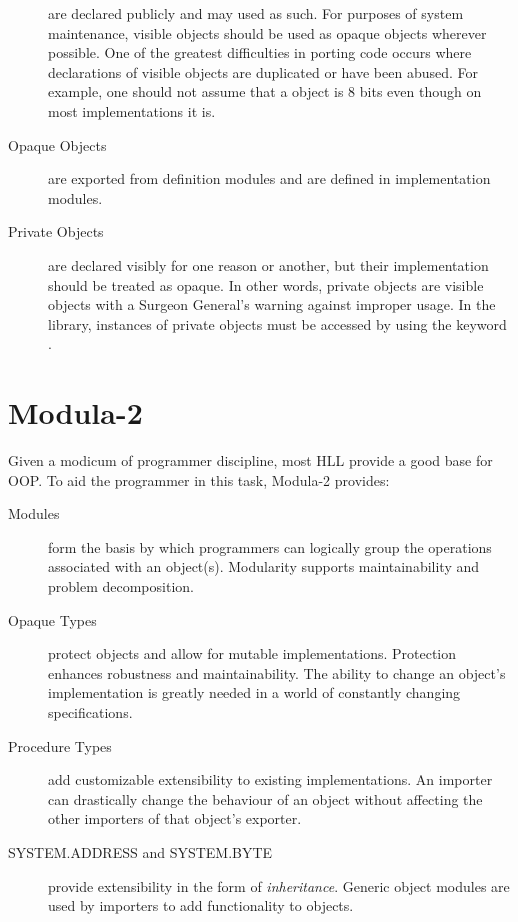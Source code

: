 \begin{description}
    are declared publicly and may used as such.
    For purposes of system maintenance, visible objects should be used as
    opaque objects wherever possible.  One of the greatest difficulties
    in porting code occurs where declarations of visible objects are duplicated
    or have been abused.  For example, one should not assume that a
     object is 8 bits even though on most implementations it is.
\item[Opaque Objects] 
    are exported from definition modules and are defined in implementation
    modules.
\item[Private Objects]  
    are declared visibly for one reason or another,
    but their implementation should be treated as opaque.  In other words,
    private objects are visible objects with a Surgeon General's warning
    against improper usage.
    In the library, instances of private objects must be accessed by
    using the keyword .
\end{description}


\section{Modula-2}

Given a modicum of programmer discipline,
most HLL provide a good base for OOP.
To aid the programmer in this task, Modula-2 provides:

\begin{description}
\item[Modules] 
    form the basis by which programmers can logically group
    the operations associated with an object(s).  Modularity supports
    maintainability and problem decomposition.

\item[Opaque Types] 
    protect objects and allow for mutable implementations.  
    Protection enhances robustness and maintainability.  The
    ability to change an object's implementation is greatly needed
    in a world of constantly changing specifications.
    
\item[Procedure Types] 
    add customizable extensibility to existing
    implementations.  An importer can drastically change the behaviour
    of an object without affecting the other importers of that object's exporter.

\item[SYSTEM.ADDRESS and SYSTEM.BYTE] 
     
    provide extensibility in the
    form of {\em inheritance}.  Generic object modules are used by
    importers to add functionality to objects.  

\end{description}

